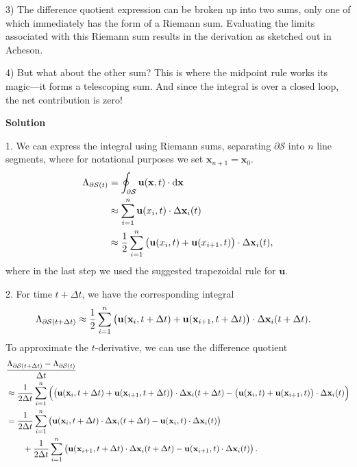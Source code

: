 \documentclass{article}
\def\*#1{\mathbf{#1}}
\newcommand{\fS}{\mathcal{S}} %
\begin{document}
3) The difference quotient expression can be broken up into two sums,
only one of which immediately has the form of a Riemann sum. Evaluating
the limits associated with this Riemann sum results in the derivation as
sketched out in Acheson.

4) But what about the other sum? This is where the midpoint rule works
its magic---it forms a telescoping sum. And since the integral is
over a closed loop, the net contribution is zero!

\newpage

\textbf{Solution}

1. We can express the integral using Riemann sums, separating $\partial
   \fS$ into $n$ line segments, where for notational purposes we set
   $\*x_{n + 1} = \*x_0$.
%
\begin{align*}
    \Lambda_{\partial \fS (t)}
        &= \oint_{\partial \fS} \*u(\*x, t) \cdot \dif \*x \\
        &\approx \sum_{i = 1}^n \*u(x_i, t) \cdot \Delta \*x_i(t) \\
        &\approx \frac{1}{2} \sum_{i = 1}^n \del{\*u(x_i, t) + \*u(x_{i + 1}, t)} \cdot \Delta \*x_{i}(t)
        ,
\end{align*}
%
where in the last step we used the suggested trapezoidal rule for $\*u$.

2. For time $t + \Delta t$, we have the corresponding integral
%
\begin{align*}
    \Lambda_{\partial \fS (t + \Delta t)}
        &\approx \frac{1}{2} \sum_{i = 1}^n \del{\*u(\*x_i, t + \Delta t) + \*u(\*x_{i + 1}, t + \Delta t)} \cdot \Delta \*x_i(t + \Delta t)
        .
\end{align*}
%
To approximate the $t$-derivative, we can use the difference quotient
%
\begin{align*}
    &\frac{\Lambda_{\partial \fS (t + \Delta t)} - \Lambda_{\partial \fS (t)}}{\Delta t} \\
        &\approx \frac{1}{2 \Delta t} \sum_{i = 1}^n
            \del{
                \del{\*u(\*x_i, t + \Delta t) + \*u(\*x_{i + 1}, t + \Delta t)} \cdot \Delta \*x_i(t + \Delta t)
                - \del{\*u(\*x_i, t) + \*u(\*x_{i + 1}, t)} \cdot \Delta \*x_{i}(t)
            } \\
        &= \frac{1}{2 \Delta t} \sum_{i = 1}^n
            \del{
                \*u(\*x_i, t + \Delta t) \cdot \Delta \*x_i(t + \Delta t)
                - \*u(\*x_i, t) \cdot \Delta \*x_i(t)
            } \\
        &\qquad + \frac{1}{2 \Delta t} \sum_{i = 1}^n
            \del{
                \*u(\*x_{i + 1}, t + \Delta t) \cdot \Delta \*x_i(t + \Delta t)
                - \*u(\*x_{i + 1}, t) \cdot \Delta \*x_i(t)
            }
        .
\end{align*}
\end{document}
